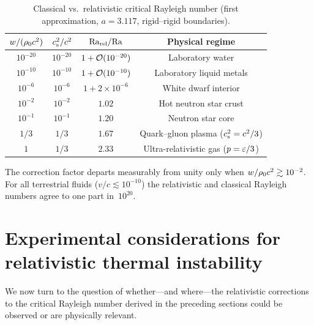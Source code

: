 \begin{table}[htbp]
\centering
\caption{Classical vs.\ relativistic critical Rayleigh number
  (first approximation, $a=3.117$, rigid--rigid boundaries).}
\label{tab:rel-Ra-comparison}
\medskip
\begin{tabular}{@{}c c c c@{}}
\toprule
$w/(\rho_0 c^{2})$ & $c_{\mathrm{s}}^{2}/c^{2}$ &
$\mathrm{Ra}_{\mathrm{rel}}/\mathrm{Ra}$ & Physical regime \\
\midrule
$10^{-20}$ & $10^{-20}$ & $1 + \mathcal{O}(10^{-20})$ & Laboratory water \\
$10^{-10}$ & $10^{-10}$ & $1 + \mathcal{O}(10^{-10})$ & Laboratory liquid metals \\
$10^{-6}$  & $10^{-6}$  & $1 + 2\times 10^{-6}$  & White dwarf interior \\
$10^{-2}$  & $10^{-2}$  & $1.02$ & Hot neutron star crust \\
$10^{-1}$  & $10^{-1}$  & $1.20$ & Neutron star core \\
$1/3$      & $1/3$      & $1.67$ & Quark--gluon plasma ($c_{\mathrm{s}}^{2}=c^{2}/3$) \\
$1$        & $1/3$      & $2.33$ & Ultra-relativistic gas ($p=\varepsilon/3$) \\
\bottomrule
\end{tabular}
\end{table}

\begin{relcorrection}
The correction factor departs measurably from unity only when
$w/\rho_0 c^{2} \gtrsim 10^{-2}$.  For all terrestrial
fluids ($v/c \lesssim 10^{-10}$) the relativistic and classical
Rayleigh numbers agree to one part in~$10^{20}$.
\end{relcorrection}


\section{Experimental considerations for relativistic thermal
  instability}\label{sec:rel-18}

We now turn to the question of whether---and where---the relativistic
corrections to the critical Rayleigh number derived in the preceding
sections could be observed or are physically relevant.


